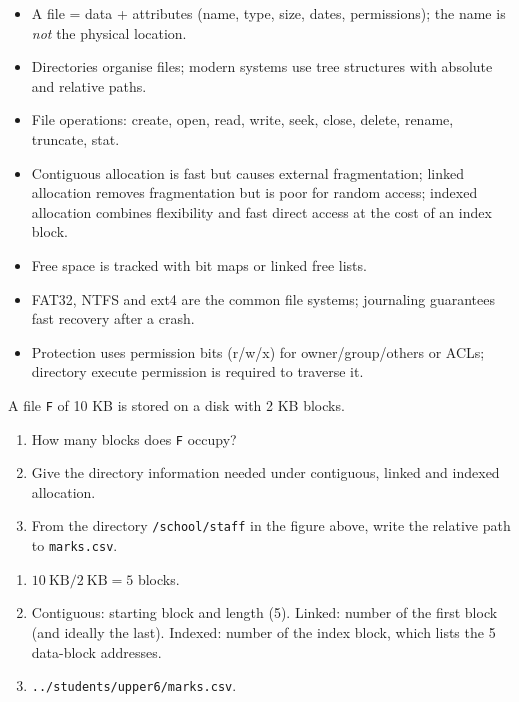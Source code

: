 \documentclass[11pt]{article}
\begin{document}
\begin{aretenir}
\begin{itemize}
\item A file = data + attributes (name, type, size, dates, permissions); the name is \emph{not} the physical location.
\item Directories organise files; modern systems use tree structures with absolute and relative paths.
\item File operations: create, open, read, write, seek, close, delete, rename, truncate, stat.
\item Contiguous allocation is fast but causes external fragmentation; linked allocation removes fragmentation but is poor for random access; indexed allocation combines flexibility and fast direct access at the cost of an index block.
\item Free space is tracked with bit maps or linked free lists.
\item FAT32, NTFS and ext4 are the common file systems; journaling guarantees fast recovery after a crash.
\item Protection uses permission bits (r/w/x) for owner/group/others or ACLs; directory execute permission is required to traverse it.
\end{itemize}
\end{aretenir}

\begin{exercice}
A file \texttt{F} of 10 KB is stored on a disk with 2 KB blocks.
\begin{enumerate}
\item How many blocks does \texttt{F} occupy?
\item Give the directory information needed under contiguous, linked and indexed allocation.
\item From the directory \texttt{/school/staff} in the figure above, write the relative path to \texttt{marks.csv}.
\end{enumerate}
\end{exercice}

\begin{corrige}[Exercise 1]
\begin{enumerate}
\item $10\ \text{KB} / 2\ \text{KB} = 5$ blocks.
\item Contiguous: starting block and length (5). Linked: number of the first block (and ideally the last). Indexed: number of the index block, which lists the 5 data-block addresses.
\item \texttt{../students/upper6/marks.csv}.
\end{enumerate}
\end{corrige}
\end{document}
